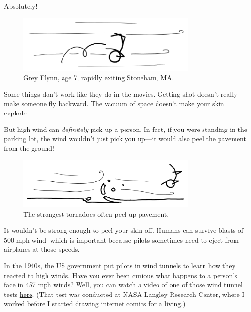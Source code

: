 {\hfill{}

{Absolutely!}

\begin{figure}[!htbp]
\centering
\includegraphics[scale=0.5, max width=0.8\textwidth]{imgs/a/66/wind_pickup.png}
\caption{Grey Flynn, age 7, rapidly exiting Stoneham, MA.}
\end{figure}

{Some things don't work like they do in the movies. Getting shot doesn't really make someone fly backward. The vacuum of space doesn't make your skin explode.}

{But high wind can \emph{definitely} pick up a person. In fact, if you were standing in the parking lot, the wind wouldn't just pick you up—it would also peel the pavement from the ground!}

\begin{figure}[!htbp]
\centering
\includegraphics[scale=0.5, max width=0.8\textwidth]{imgs/a/66/wind_pavement.png}
\caption{The strongest tornadoes often peel up pavement.}
\end{figure}

{It wouldn't be strong enough to peel your skin off. Humans can survive blasts of 500 mph wind, which is important because pilots sometimes need to eject from airplanes at those speeds.}

{In the 1940s, the US government put pilots in wind tunnels to learn how they reacted to high winds. Have you ever been curious what happens to a person's face in 457 mph winds? Well, you can watch a video of one of those wind tunnel tests \href{http://www.youtube.com/watch?v=IU4SDDNXuUA}{here}. (That test was conducted at NASA Langley Research Center, where I worked before I started drawing internet comics for a living.)}

}
